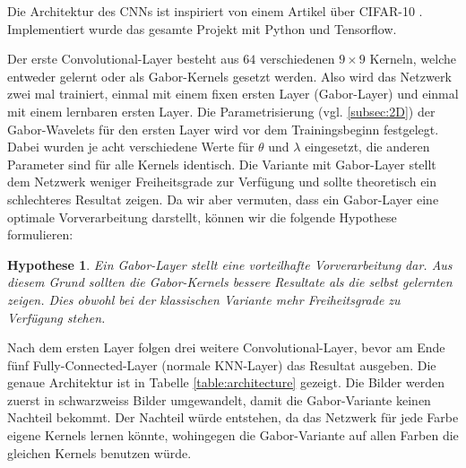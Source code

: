 Die Architektur des CNNs ist inspiriert von einem Artikel über CIFAR-10 \cite{online:cifar10}.
Implementiert wurde das gesamte Projekt mit Python und Tensorflow.

Der erste Convolutional-Layer besteht aus $64$ verschiedenen $9 \times 9$ Kerneln, welche entweder gelernt oder als Gabor-Kernels gesetzt werden.
Also wird das Netzwerk zwei mal trainiert, einmal mit einem fixen ersten Layer (Gabor-Layer) und einmal mit einem lernbaren ersten Layer.
Die Parametrisierung (vgl. \ref{subsec:2D}) der Gabor-Wavelets für den ersten Layer wird vor dem Trainingsbeginn festgelegt.
Dabei wurden je acht verschiedene Werte für $\theta$ und $\lambda$ eingesetzt, die anderen Parameter sind für alle Kernels identisch.
Die Variante mit Gabor-Layer stellt dem Netzwerk weniger Freiheitsgrade zur Verfügung und sollte theoretisch ein schlechteres Resultat zeigen.
Da wir aber vermuten, dass ein Gabor-Layer eine optimale Vorverarbeitung darstellt, können wir die folgende Hypothese formulieren:
\newtheorem*{hypothese}{Hypothese}
\begin{hypothese}\label{hyp:1}
	 Ein Gabor-Layer stellt eine vorteilhafte Vorverarbeitung dar.
	 Aus diesem Grund sollten die Gabor-Kernels bessere Resultate als die selbst gelernten zeigen.
	 Dies obwohl bei der klassischen Variante mehr Freiheitsgrade zu Verfügung stehen.
\end{hypothese}

Nach dem ersten Layer folgen drei weitere Convolutional-Layer, bevor am Ende fünf Fully-Connected-Layer (normale KNN-Layer) das Resultat ausgeben.
Die genaue Architektur ist in Tabelle \ref{table:architecture} gezeigt.
Die Bilder werden zuerst in schwarzweiss Bilder umgewandelt, damit die Gabor-Variante keinen Nachteil bekommt.
Der Nachteil würde entstehen, da das Netzwerk für jede Farbe eigene Kernels lernen könnte, wohingegen die Gabor-Variante auf allen Farben die gleichen Kernels benutzen würde. 

